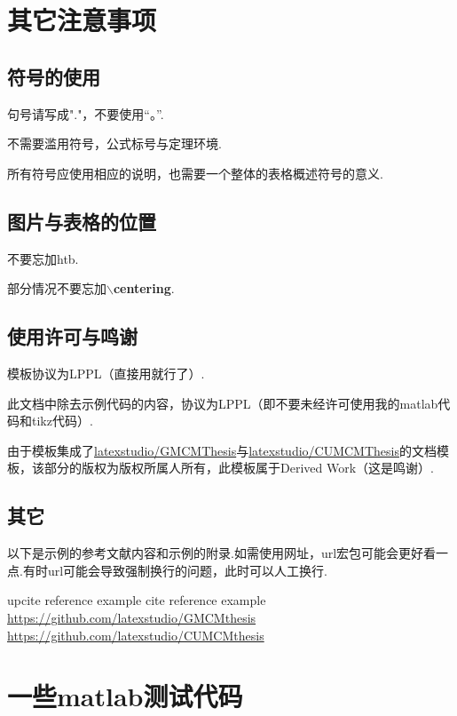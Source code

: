 \documentclass[bwprint, withouttitlepage]{mathexpthesis}
\begin{document}
\section{其它注意事项}
\subsection{符号的使用}
句号请写成"."，不要使用“。”.

不需要滥用符号，公式标号与定理环境.

所有符号应使用相应的说明，也需要一个整体的表格概述符号的意义.

\subsection{图片与表格的位置}
不要忘加htb.

部分情况不要忘加$\backslash$\textbf{centering}.

\subsection{使用许可与鸣谢}
模板协议为LPPL（直接用就行了）.

此文档中除去示例代码的内容，协议为LPPL（即不要未经许可使用我的matlab代码和tikz代码）.

由于模板集成了\href{https://github.com/latexstudio/GMCMthesis}{latexstudio/GMCMThesis}与\href{https://github.com/latexstudio/CUMCMthesis}{latexstudio/CUMCMThesis}的文档模板，该部分的版权为版权所属人所有，此模板属于Derived Work（这是鸣谢）.

\subsection{其它}
以下是示例的参考文献内容和示例的附录.如需使用网址，url宏包可能会更好看一点.有时url可能会导致强制换行的问题，此时可以人工换行.

\begin{thebibliography}{99}
     upcite reference example
     cite reference example
     \url{https://github.com/latexstudio/GMCMthesis}
     \url{https://github.com/latexstudio/CUMCMthesis}
\end{thebibliography}

\appendix
\section{一些matlab测试代码}
\end{document}
